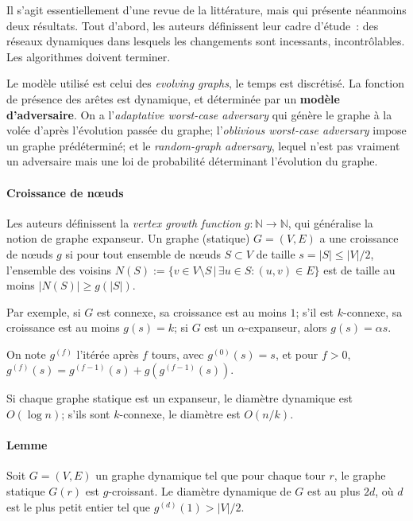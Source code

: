 \documentclass[12pt,a4paper]{article}
\begin{document}
Il s'agit essentiellement d'une revue de la littérature, mais qui
présente néanmoins deux résultats. Tout d'abord, les auteurs
définissent leur cadre d'étude~: des réseaux dynamiques dans lesquels
les changements sont incessants, incontrôlables. Les algorithmes
doivent terminer.

Le modèle utilisé est celui des \textit{evolving graphs}, le temps est
discrétisé. La fonction de présence des arêtes est dynamique, et
déterminée par un \textbf{modèle d'adversaire}. On a
l'\textit{adaptative worst-case adversary} qui génère le graphe à la
volée d'après l'évolution passée du graphe; l'\textit{oblivious
  worst-case adversary} impose un graphe prédéterminé; et le
\textit{random-graph adversary}, lequel n'est pas vraiment un
adversaire mais une loi de probabilité déterminant l'évolution du
graphe.

\paragraph{Croissance de nœuds} Les auteurs définissent la
\textit{vertex growth function} \(g : \mathbb{N} \to \mathbb{N}\), qui
généralise la notion de graphe expanseur. Un graphe (statique)
\(G = (V, E)\) a une croissance de nœuds \(g\) si pour tout ensemble
de nœuds \(S \subset V\) de taille \(s = |S| \leq |V|/2\), l'ensemble
des voisins
\(N(S) := \{v \in V \setminus S \,|\, \exists u \in S : (u, v) \in
E\}\) est de taille au moins \(|N(S)| \geq g(|S|)\).

Par exemple, si \(G\) est connexe, sa croissance est au moins \(1\);
s'il est \(k\)-connexe, sa croissance est au moins \(g(s) = k\); si
\(G\) est un \(\alpha\)-expanseur, alors \(g(s) = \alpha s\).

On note \(g^{(f)}\) l'itérée après \(f\) tours, avec
\(g^{(0)}(s) = s\), et pour \(f > 0\),
\(g^{(f)}(s) = g^{(f-1)}(s) + g(g^{(f-1)}(s))\).

Si chaque graphe statique est un expanseur, le diamètre dynamique est
\(O(\log n)\); s'ils sont \(k\)-connexe, le diamètre est \(O(n/k)\).

\paragraph{Lemme} Soit \(G = (V, E)\) un graphe dynamique tel que pour
chaque tour \(r\), le graphe statique \(G(r)\) est \(g\)-croissant. Le
diamètre dynamique de \(G\) est au plus \(2d\), où \(d\) est le plus
petit entier tel que \(g^{(d)}(1) > |V|/2\).\\
\end{document}
